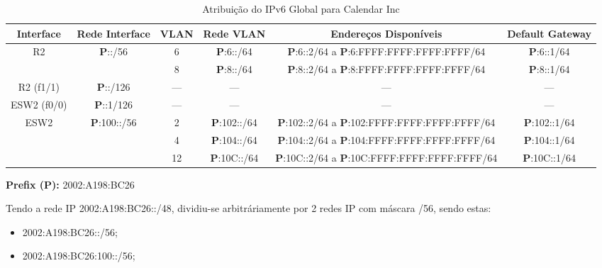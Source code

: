 \documentclass{report}
\begin{document}
\begin{table}[h!]
    \hspace*{-4.0cm}
    \centering
    \setlength{\tabcolsep}{2pt} %
    \renewcommand{\arraystretch}{1.3} %
    \begin{tabular}{|c|c|c|c|c|c|} %
        \hline
        \textbf{Interface} & \textbf{Rede Interface} & \textbf{VLAN} & \textbf{Rede VLAN} & \textbf{Endereços Disponíveis} & \textbf{Default Gateway} \\ \hline
        
        \multirow{2}{*}{R2} & \multirow{2}{*}{\textbf{P}::/56} & 6 & \textbf{P}:6::/64 & \textbf{P}:6::2/64 a \textbf{P}:6:FFFF:FFFF:FFFF:FFFF/64 & \textbf{P}:6::1/64 \\ \cline{3-6}   
         & & 8 & \textbf{P}:8::/64 & \textbf{P}:8::2/64 a \textbf{P}:8:FFFF:FFFF:FFFF:FFFF/64 & \textbf{P}:8::1/64 \\ \cline{3-6} \hline

         R2 (f1/1) & \textbf{P}::/126 & --- & --- & --- & --- \\ \hline

         ESW2 (f0/0) & \textbf{P}::1/126 & --- & --- & --- & --- \\ \hline
         
        \multirow{3}{*}{ESW2} & \multirow{3}{*}{\textbf{P}:100::/56} & 2 & \textbf{P}:102::/64 & \textbf{P}:102::2/64 a \textbf{P}:102:FFFF:FFFF:FFFF:FFFF/64 & \textbf{P}:102::1/64 \\ \cline{3-6} 
         & & 4 & \textbf{P}:104::/64 & \textbf{P}:104::2/64 a \textbf{P}:104:FFFF:FFFF:FFFF:FFFF/64 & \textbf{P}:104::1/64 \\ \cline{3-6}   
         & & 12 & \textbf{P}:10C::/64 & \textbf{P}:10C::2/64 a \textbf{P}:10C:FFFF:FFFF:FFFF:FFFF/64 & \textbf{P}:10C::1/64 \\ \hline

    \end{tabular}
    \textbf{Prefix (P):}
    2002:A198:BC26
    \caption{Atribuição do IPv6 Global para Calendar Inc}
\end{table}

Tendo a rede IP 2002:A198:BC26::/48, dividiu-se arbitráriamente por 2 redes IP com máscara /56, sendo estas: 
\begin{itemize}
    \item 2002:A198:BC26::/56;
    \item 2002:A198:BC26:100::/56; 
\end{itemize}
\end{document}
